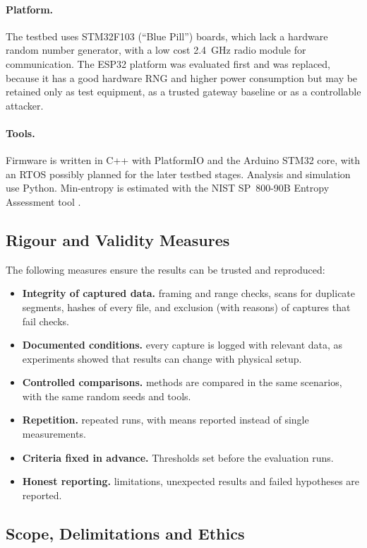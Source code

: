 \documentclass[a4paper, 12pt]{article}
\begin{document}
\paragraph{Platform.} The testbed uses STM32F103 (``Blue Pill'') boards, which lack a hardware random number generator, with a low cost 2.4~GHz radio module for communication. The ESP32 platform was evaluated first and was replaced, because it has a good hardware RNG and higher power consumption but may be retained only as test equipment, as a trusted gateway baseline or as a controllable attacker.
 
\paragraph{Tools.} Firmware is written in C++ with PlatformIO and the Arduino STM32 core, with an RTOS possibly planned for the later testbed stages. Analysis and simulation use Python. Min-entropy is estimated with the NIST SP~800-90B Entropy Assessment tool \citep{turan2018sp80090b}.
 
\subsection{Rigour and Validity Measures}
 
The following measures ensure the results can be trusted and reproduced:
\begin{itemize}
    \item \textbf{Integrity of captured data.} framing and range checks, scans for duplicate segments, hashes of every file, and exclusion (with reasons) of captures that fail checks.
    \item \textbf{Documented conditions.} every capture is logged with relevant data, as experiments showed that results can change with physical setup.
    \item \textbf{Controlled comparisons.} methods are compared in the same scenarios, with the same random seeds and tools.
    \item \textbf{Repetition.} repeated runs, with means reported instead of single measurements.
    \item \textbf{Criteria fixed in advance.} Thresholds set before the evaluation runs.
    \item \textbf{Honest reporting.} limitations, unexpected results and failed hypotheses are reported.
\end{itemize}
 
\subsection{Scope, Delimitations and Ethics}
 
\end{document}

